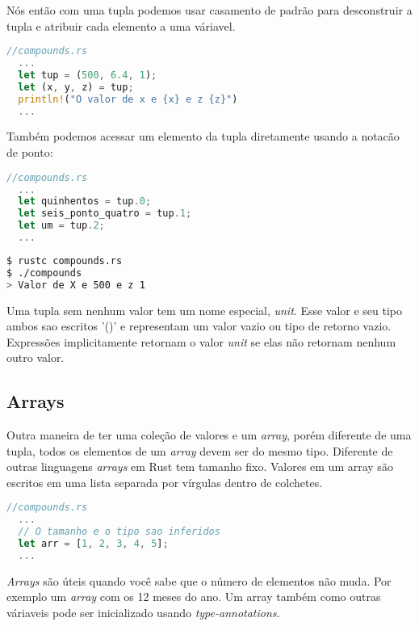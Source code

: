 Nós então com uma tupla podemos usar casamento de padrão para desconstruir a tupla e atribuir cada elemento a uma váriavel.

\begin{lstlisting}[language=rust]
//compounds.rs
  ...
  let tup = (500, 6.4, 1);
  let (x, y, z) = tup;
  println!("O valor de x e {x} e z {z}")
  ...
\end{lstlisting}

Também podemos acessar um elemento da tupla diretamente usando a notacão de ponto:

\begin{lstlisting}[language=rust]
//compounds.rs
  ...
  let quinhentos = tup.0;
  let seis_ponto_quatro = tup.1;
  let um = tup.2;
  ...
\end{lstlisting}

\begin{lstlisting}[language=bash]
$ rustc compounds.rs
$ ./compounds
> Valor de X e 500 e z 1
\end{lstlisting}

Uma tupla sem nenhum valor tem um nome especial, \textit{unit}. Esse valor e seu tipo ambos sao escritos '()' e representam um valor vazio ou tipo de retorno vazio. Expressões implicitamente retornam o valor \textit{unit} se elas não retornam nenhum outro valor.

\pagebreak
\newpage

\subsection{Arrays}

Outra maneira de ter uma coleção de valores e um \textit{array}, porém diferente de uma tupla, todos os elementos de um \textit{array} devem ser do mesmo tipo. Diferente de outras linguagens \textit{arrays} em Rust tem tamanho fixo. Valores em um array são escritos em uma lista separada por vírgulas dentro de colchetes.

\begin{lstlisting}[language=rust]
//compounds.rs
  ...
  // O tamanho e o tipo sao inferidos 
  let arr = [1, 2, 3, 4, 5];
  ...
\end{lstlisting}

\textit{Arrays} são úteis quando você sabe que o número de elementos não muda. Por exemplo um \textit{array} com os 12 meses do ano. Um array também como outras váriaveis pode ser inicializado usando \textit{type-annotations}.

